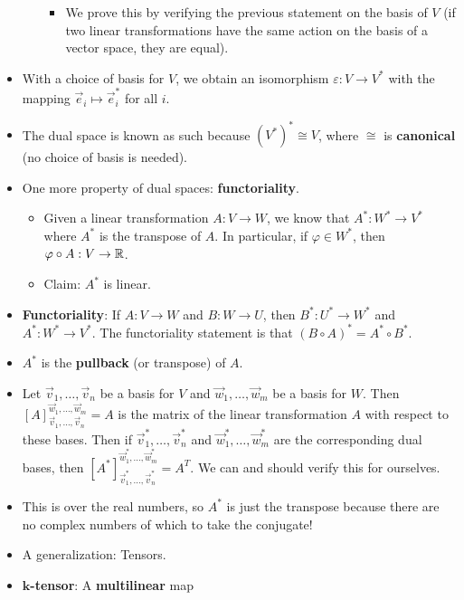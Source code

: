 \documentclass[../notes.tex]{subfiles}
\begin{document}
\begin{itemize}
\begin{itemize}
\begin{equation*}
        \end{equation*}
        \begin{itemize}
            \item We prove this by verifying the previous statement on the basis of $V$ (if two linear transformations have the same action on the basis of a vector space, they are equal).
        \end{itemize}
    \end{itemize}
    \item With a choice of basis for $V$, we obtain an isomorphism $\varepsilon:V\to V^*$ with the mapping $\vec{e}_i\mapsto\vec{e}_i^*$ for all $i$.
    \item The dual space is known as such because $(V^*)^*\cong V$, where $\cong$ is \textbf{canonical} (no choice of basis is needed).
    \item One more property of dual spaces: \textbf{functoriality}.
    \begin{itemize}
        \item Given a linear transformation $A:V\to W$, we know that $A^*:W^*\to V^*$ where $A^*$ is the transpose of $A$. In particular, if $\varphi\in W^*$, then $\varphi\circ A:V\to\mathbb{R}$.
        \item Claim: $A^*$ is linear.
    \end{itemize}
    \item \textbf{Functoriality}: If $A:V\to W$ and $B:W\to U$, then $B^*:U^*\to W^*$ and $A^*:W^*\to V^*$. The functoriality statement is that $(B\circ A)^*=A^*\circ B^*$.
    \item $A^*$ is the \textbf{pullback} (or transpose) of $A$.
    \item Let $\vec{v}_1,\dots,\vec{v}_n$ be a basis for $V$ and $\vec{w}_1,\dots,\vec{w}_m$ be a basis for $W$. Then $[A]_{\vec{v}_1,\dots,\vec{v}_n}^{\vec{w}_1,\dots,\vec{w}_m}=A$ is the matrix of the linear transformation $A$ with respect to these bases. Then if $\vec{v}_1^*,\dots,\vec{v}_n^*$ and $\vec{w}_1^*,\dots,\vec{w}_m^*$ are the corresponding dual bases, then $[A^*]_{\vec{v}_1^*,\dots,\vec{v}_n^*}^{\vec{w}_1^*,\dots,\vec{w}_m^*}=A^T$. We can and should verify this for ourselves.
    \item This is over the real numbers, so $A^*$ is just the transpose because there are no complex numbers of which to take the conjugate!
    \item A generalization: Tensors.
    \item \textbf{$\bm{k}$-tensor}: A \textbf{multilinear} map
    \begin{equation*}

\end{equation*}
\end{itemize}
\end{document}
